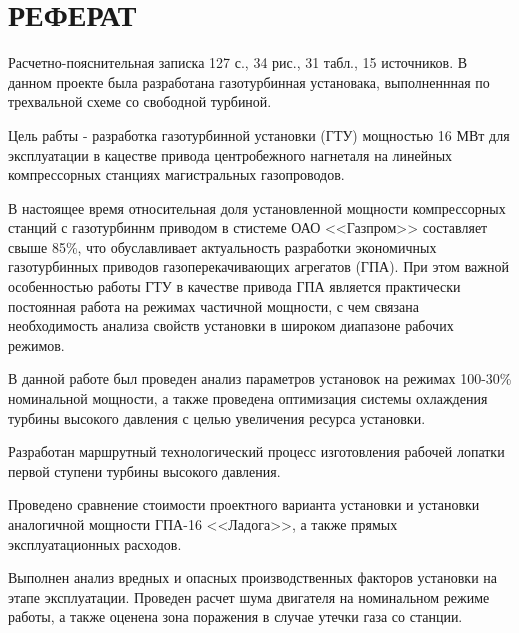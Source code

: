 \section*{РЕФЕРАТ}
Расчетно-пояснительная записка 127 с., 34 рис., 31 табл., 15 источников.
В данном проекте была разработана газотурбинная установака, выполненнная
по трехвальной схеме со свободной турбиной.

Цель рабты - разработка газотурбинной установки (ГТУ) мощностью 16 МВт для
эксплуатации в кацестве привода центробежного нагнеталя на линейных 
компрессорных станциях магистральных газопроводов.

В настоящее время относительная доля установленной мощности компрессорных станций с газотурбиннм приводом в стистеме ОАО <<Газпром>> составляет свыше 85\%, что обуславливает актуальность разработки экономичных газотурбинных приводов газоперекачивающих агрегатов (ГПА). При этом важной особенностью работы ГТУ в качестве привода ГПА является практически постоянная работа на режимах частичной мощности, с чем связана необходимость анализа свойств установки в широком диапазоне рабочих режимов.

В данной работе был проведен анализ параметров установок на режимах 100-30\% номинальной мощности, а также проведена оптимизация системы охлаждения турбины высокого давления с целью увеличения ресурса установки.

Разработан маршрутный технологический процесс изготовления рабочей лопатки первой ступени турбины высокого давления.

Проведено сравнение стоимости проектного варианта установки и установки аналогичной мощности ГПА-16 <<Ладога>>, а также прямых эксплуатационных расходов.

Выполнен анализ вредных и опасных производственных факторов установки на этапе эксплуатации. Проведен расчет шума двигателя на номинальном режиме работы, а также оценена зона поражения в случае утечки газа со станции.
